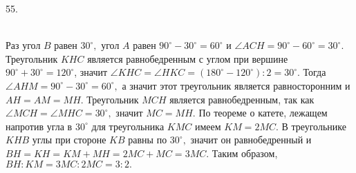55. \begin{figure}[ht!]
\end{figure}\\
Раз угол $B$ равен $30^\circ,$ угол $A$ равен $90^\circ-30^\circ=60^\circ$ и $\angle ACH=90^\circ-60^\circ=30^\circ.$  Треугольник $KHC$ является равнобедренным с углом при вершине $90^\circ+30^\circ=120^\circ$, значит $\angle KHC=\angle HKC=(180^\circ-120^\circ):2=30^\circ.$ Тогда $\angle AHM=90^\circ-30^\circ=60^\circ,$ а значит этот треугольник является равносторонним и $AH=AM=MH.$ Треугольник $MCH$ является равнобедренным, так как $\angle MCH=\angle MHC=30^\circ,$ значит $MC=MH.$  По теореме о катете, лежащем напротив угла в $30^\circ$ для треугольника $KMC$ имеем $KM=2MC.$ В треугольнике $KHB$ углы при стороне $KB$ равны по $30^\circ,$ значит он равнобедренный и  $BH=KH=KM+MH=2MC+MC=3MC.$ Таким образом, $BH:KM=3MC:2MC=3:2.$\\
